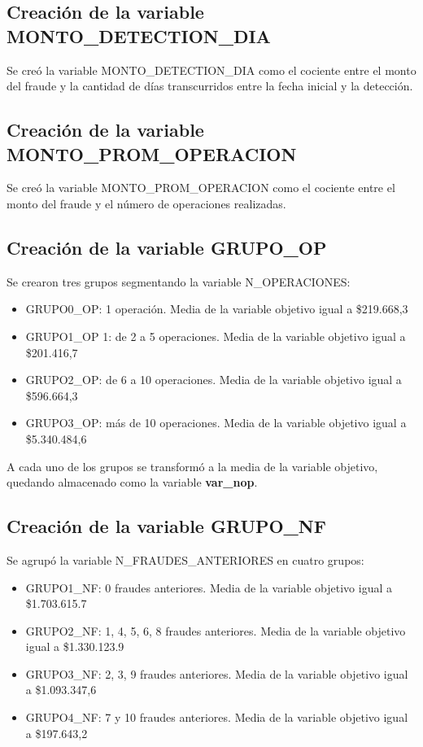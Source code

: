 \documentclass[
	11pt, %
	spanish, %
]{fphw}
\begin{document}
\subsection*{Creación de la variable MONTO\_DETECTION\_DIA}
Se creó la variable MONTO\_DE\-TEC\-TION\_DIA como el cociente entre el monto del fraude y la cantidad de días transcurridos entre la fecha inicial y la detección.

\subsection*{Creación de la variable MONTO\_PROM\_OPERACION}
Se creó la variable MON\-TO\_PROM\_\-OPE\-RA\-CION como el cociente entre el monto del fraude y el número de operaciones realizadas.


\subsection*{Creación de la variable GRUPO\_OP}
Se crearon tres grupos segmentando la variable N\_OPE\-RA\-CIO\-NES:
\begin{itemize}
\item GRUPO0\_OP: 1 operación. Media de la variable objetivo igual a \$219.668,3
\item GRUPO1\_OP 1: de 2 a 5 operaciones. Media de la variable objetivo igual a \$201.416,7
\item GRUPO2\_OP: de 6 a 10 operaciones. Media de la variable objetivo igual a \$596.664,3
\item GRUPO3\_OP: más de 10 operaciones. Media de la variable objetivo igual a \$5.340.484,6
\end{itemize}

A cada uno de los grupos se transformó a la media de la variable objetivo, quedando almacenado como la variable \textbf{var\_nop}.


\subsection*{Creación de la variable GRUPO\_NF}
Se agrupó la variable N\_FRAUDES\_ANTERIORES en cuatro grupos:
\begin{itemize}
\item GRUPO1\_NF: 0 fraudes anteriores. Media de la variable objetivo igual a \$1.703.615.7
\item GRUPO2\_NF: 1, 4, 5, 6, 8 fraudes anteriores.  Media de la variable objetivo igual a \$1.330.123.9
\item GRUPO3\_NF: 2, 3, 9 fraudes anteriores. Media de la variable objetivo igual a \$1.093.347,6
\item GRUPO4\_NF: 7 y 10 fraudes anteriores. Media de la variable objetivo igual a \$197.643,2
\end{itemize}
\end{document}
